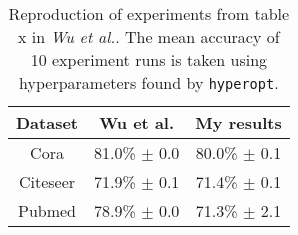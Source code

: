 \begin{table}
    \centering
    \begin{tabular}{c|cc}
        \multicolumn{1}{c}{\textbf{Dataset}} &
        \multicolumn{1}{c}{\textbf{Wu et al.}} &
        \multicolumn{1}{c}{\textbf{My results}} \\
        \midrule
        Cora        & 81.0\% $\pm$ 0.0 & 80.0\% $\pm$ 0.1 \\
        Citeseer    & 71.9\% $\pm$ 0.1 & 71.4\% $\pm$ 0.1 \\
        Pubmed      & 78.9\% $\pm$ 0.0 & 71.3\% $\pm$ 2.1 \\
    \end{tabular}
    \caption{Reproduction of experiments from table x in \textit{Wu et al.}\cite{wu2019simplifying}. The mean accuracy of 10 experiment runs is taken using hyperparameters found by \texttt{hyperopt}.}
    \label{tab:SGC-reproduction}
\end{table}

